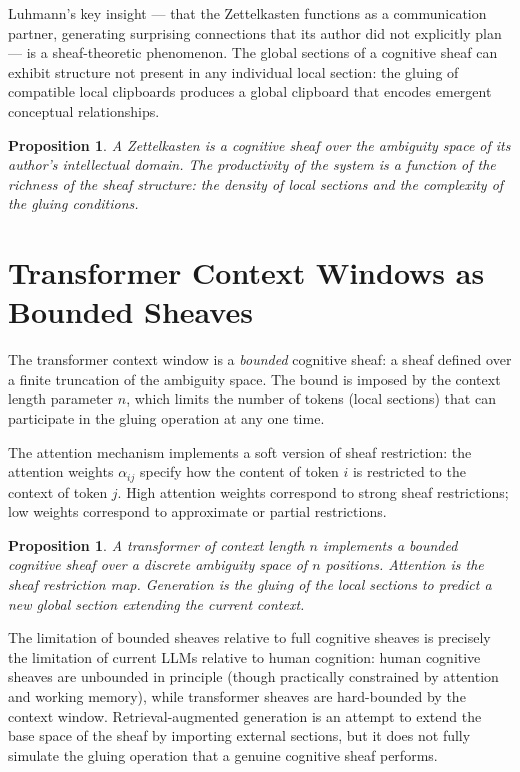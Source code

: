 \documentclass[12pt,oneside]{book}
\theoremstyle{plain}
\newtheorem{proposition}[theorem]{Proposition}
\theoremstyle{definition}
\theoremstyle{plain}
\begin{document}
Luhmann's key insight — that the Zettelkasten functions as a communication partner, generating surprising connections that its author did not explicitly plan — is a sheaf-theoretic phenomenon. The global sections of a cognitive sheaf can exhibit structure not present in any individual local section: the gluing of compatible local clipboards produces a global clipboard that encodes emergent conceptual relationships.

\begin{proposition}
A Zettelkasten is a cognitive sheaf over the ambiguity space of its author's intellectual domain. The productivity of the system is a function of the richness of the sheaf structure: the density of local sections and the complexity of the gluing conditions.
\end{proposition}

\section{Transformer Context Windows as Bounded Sheaves}

The transformer context window is a \emph{bounded} cognitive sheaf: a sheaf defined over a finite truncation of the ambiguity space. The bound is imposed by the context length parameter $n$, which limits the number of tokens (local sections) that can participate in the gluing operation at any one time.

The attention mechanism implements a soft version of sheaf restriction: the attention weights $\alpha_{ij}$ specify how the content of token $i$ is restricted to the context of token $j$. High attention weights correspond to strong sheaf restrictions; low weights correspond to approximate or partial restrictions.

\begin{proposition}
A transformer of context length $n$ implements a bounded cognitive sheaf over a discrete ambiguity space of $n$ positions. Attention is the sheaf restriction map. Generation is the gluing of the local sections to predict a new global section extending the current context.
\end{proposition}

The limitation of bounded sheaves relative to full cognitive sheaves is precisely the limitation of current LLMs relative to human cognition: human cognitive sheaves are unbounded in principle (though practically constrained by attention and working memory), while transformer sheaves are hard-bounded by the context window. Retrieval-augmented generation is an attempt to extend the base space of the sheaf by importing external sections, but it does not fully simulate the gluing operation that a genuine cognitive sheaf performs.
\end{document}
